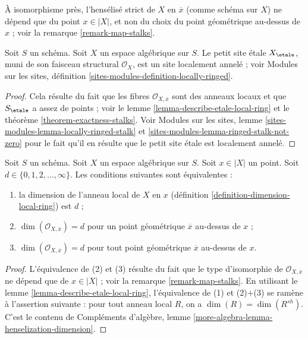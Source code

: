 \noindent
À isomorphisme près, l'hensélisé strict de $X$ en $\overline{x}$
(comme schéma sur $X$) ne dépend que du point $x \in |X|$, et non
du choix du point géométrique au-dessus de $x$ ; voir la
remarque \ref{remark-map-stalks}.

\begin{lemma}
\label{lemma-etale-site-locally-ringed}
Soit $S$ un schéma.
Soit $X$ un espace algébrique sur $S$.
Le petit site \'etale $X_\etale$, muni de son
faisceau structural $\mathcal{O}_X$, est un site localement annelé ; voir
Modules sur les sites, définition \ref{sites-modules-definition-locally-ringed}.
\end{lemma}

\begin{proof}
Cela résulte du fait que les fibres
$\mathcal{O}_{X, \overline{x}}$ sont
des anneaux locaux et que $S_\etale$ a assez de points ; voir le
lemme \ref{lemma-describe-etale-local-ring} et le
théorème \ref{theorem-exactness-stalks}.
Voir
Modules sur les sites, lemme \ref{sites-modules-lemma-locally-ringed-stalk} et
\ref{sites-modules-lemma-ringed-stalk-not-zero}
pour le fait qu'il en résulte que le petit site \'etale est localement annelé.
\end{proof}

\begin{lemma}
\label{lemma-dimension-local-ring}
Soit $S$ un schéma. Soit $X$ un espace algébrique sur $S$.
Soit $x \in |X|$ un point. Soit $d \in \{0, 1, 2, \ldots, \infty\}$.
Les conditions suivantes sont équivalentes :
\begin{enumerate}
\item la dimension de l'anneau local de $X$ en $x$
(définition \ref{definition-dimension-local-ring}) est $d$ ;
\item $\dim(\mathcal{O}_{X, \overline{x}}) = d$ pour un point
géométrique $\overline{x}$ au-dessus de $x$ ;
\item $\dim(\mathcal{O}_{X, \overline{x}}) = d$ pour tout point
géométrique $\overline{x}$ au-dessus de $x$.
\end{enumerate}
\end{lemma}

\begin{proof}
L'équivalence de (2) et (3) résulte du fait que le
type d'isomorphie de $\mathcal{O}_{X, \overline{x}}$ ne dépend que
de $x \in |X|$ ; voir la remarque \ref{remark-map-stalks}.
En utilisant le lemme \ref{lemma-describe-etale-local-ring},
l'équivalence de (1) et (2)$+$(3) se ramène à
l'assertion suivante : pour tout anneau local $R$, on a
$\dim(R) = \dim(R^{sh})$. C'est le contenu de
Compléments d'algèbre, lemme \ref{more-algebra-lemma-henselization-dimension}.
\end{proof}

